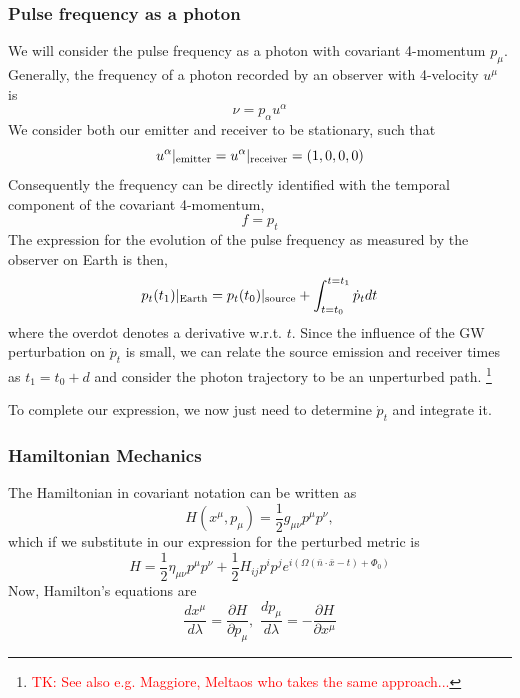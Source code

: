 \documentclass[fleqn,usenatbib,useAMS]{mnras}
\begin{document}
\subsubsection{Pulse frequency as a photon}
\noindent We will consider the pulse frequency as a photon with covariant 4-momentum $p_{\mu}$. Generally, the frequency of a photon recorded by an observer with 4-velocity $u^{\mu}$ is 
\begin{equation}
	\nu = p_{\alpha} u^{\alpha}
\end{equation}
\noindent We consider both our emitter and receiver to be stationary, such that  
\begin{equation}
	u^{\alpha}|_{\rm emitter} = u^{\alpha}|_{\rm receiver} = (1,0,0,0)
\end{equation}
\noindent Consequently the frequency can be directly identified with the temporal component of the covariant 4-momentum,
\begin{equation}
	f = p_t
\end{equation}
\noindent The expression for the evolution of the pulse frequency as measured by the observer on Earth is then,
\begin{equation}
	p_t(t_1)|_{\rm Earth} = p_t(t_0)|_{\rm source} + \int_{t = t_0}^{t=t_1} \dot{p}_t dt
\end{equation}
\noindent where the overdot denotes a derivative w.r.t. $t$. Since the influence of the GW perturbation on $\dot{p}_t$ is small, we can relate the source emission and receiver times as $t_1 = t_0 + d$ and consider the photon trajectory to be an unperturbed path. \footnote{\textcolor{red}{TK: See also e.g. Maggiore, Meltaos who takes the same approach...}} \newline 

\noindent To complete our expression, we now just need to determine $\dot{p}_t$ and integrate it.

\subsubsection{Hamiltonian Mechanics}
The Hamiltonian in covariant notation can be written as 
\begin{equation}
	H(x^{\mu}, p_{\mu}) = \frac{1}{2} g_{\mu \nu} p^{\mu} p^{\nu},
\end{equation}
\noindent which if we substitute in our expression for the perturbed metric is
\begin{equation}
	H = \frac{1}{2} \eta_{\mu \nu} p^{\mu} p^{\nu} + \frac{1}{2} H_{ij}p^i p^j e^{i(\Omega(\bar{n} \cdot \bar{x} - t) + \Phi_0)	}
\end{equation}
\noindent Now, Hamilton's equations are
\begin{equation}
	\frac{dx^{\mu}}{d\lambda} = \frac{\partial H}{\partial p_{\mu}} , \, \, \frac{dp_{\mu}}{d \lambda} = -\frac{\partial H}{\partial x^{\mu}} 
\end{equation}
\end{document}
